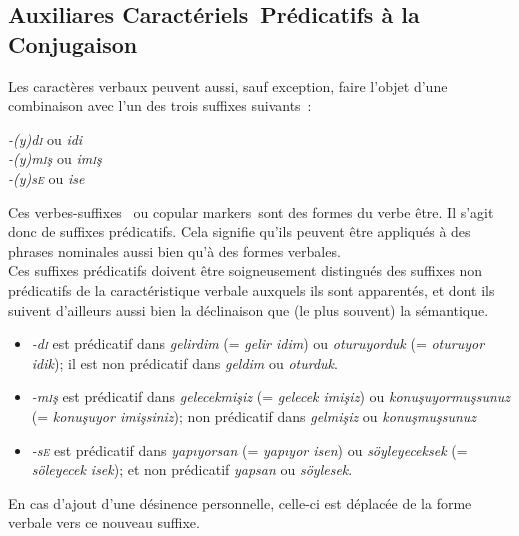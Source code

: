 \documentclass{cours}
\newcommand{\ch}{\c{s}}
\newcommand{\sci}{\textsc{i}}
\newcommand{\sce}{\textsc{e}}
\begin{document}
\subsection{Auxiliares \og Caractériels\fg\ Prédicatifs à la Conjugaison}
Les caractères verbaux peuvent aussi, sauf exception, faire l'objet d'une combinaison avec l'un des trois suffixes suivants~:
\begin{center}
    {\sl -(y)d\sci} ou {\sl idi}\\
    \textsl{-(y)m\sci \ch} ou \textsl{im\sci \ch}\\
    \textsl{-(y)s\sce} ou \textsl{ise}
\end{center}
Ces \og verbes-suffixes \fg\ ou \og copular markers\fg\ sont des formes du verbe \og être\fg. Il s'agit donc de suffixes prédicatifs. Cela signifie qu'ils peuvent être appliqués à des phrases nominales aussi bien qu'à des formes verbales.\\
Ces suffixes prédicatifs doivent être soigneusement distingués des suffixes non prédicatifs de la caractéristique verbale auxquels ils sont apparentés, et dont ils suivent d'ailleurs aussi bien la déclinaison que (le plus souvent) la sémantique.
\begin{itemize}
    \item \textsl{-d\sci} est prédicatif dans \textsl{gelirdim} (= {\sl gelir idim}) ou \textsl{oturuyorduk} (= {\sl oturuyor idik}); il est non prédicatif dans \textsl{geldim} ou \textsl{oturduk}.
    \item \textsl{-m\sci \ch} est prédicatif dans \textsl{gelecekmi\ch iz} (= {\sl gelecek imi\ch iz}) ou \textsl{konu\ch uyormu\ch sunuz} (= {\sl konu\ch uyor imi\ch siniz}); non prédicatif dans \textsl{gelmi\ch iz} ou \textsl{konu\ch mu\ch sunuz}
    \item \textsl{-s\sce} est prédicatif dans \textsl{yap\i yorsan} (= {\sl yap\i yor isen}) ou \textsl{söyleyeceksek} (= {\sl söleyecek isek}); et non prédicatif \textsl{yapsan} ou \textsl{söylesek}.
\end{itemize}
En cas d'ajout d'une désinence personnelle, celle-ci est déplacée de la forme verbale vers ce nouveau suffixe. \\
\end{document}
